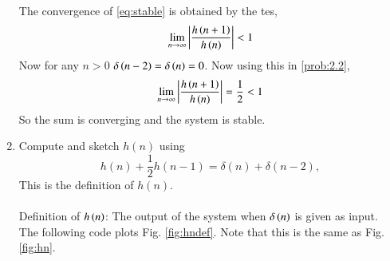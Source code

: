 \documentclass[journal,12pt,twocolumn]{IEEEtran}
\theoremstyle{remark}
\begin{document}
\begin{enumerate}[label=\thesection.\arabic*]
The convergence of \eqref{eq:stable} is obtained by the tes,
\begin{align}
    \lim_{n \to \infty}\left|\frac{h\left(n+1\right)}{h\left(n\right)}\right|<1
\end{align}
Now for any $n>0$ $\delta\left(n-2\right)=\delta\left(n\right)=0$.
Now using this in \eqref{prob:2.2},
\begin{align}
    \lim_{n \to \infty}\left|\frac{h\left(n+1\right)}{h\left(n\right)}\right|=\frac{1}{2}<1
\end{align}
So the sum is converging and the system is stable.

\item 
Compute and sketch $h(n)$ using 
\begin{equation}
\label{eq:iir_filter_h}
h(n) + \frac{1}{2}h(n-1) = \delta(n) + \delta(n-2), 
\end{equation}
%
This is the definition of $h(n)$.
\\
\solution\\
Definition of $h\left(n\right)$: The output of the system when $\delta\left(n\right)$ is given as input.\\

The following code plots Fig. \ref{fig:hndef}. Note that this is the same as Fig. 
\ref{fig:hn}. 


\end{enumerate}
\end{document}
